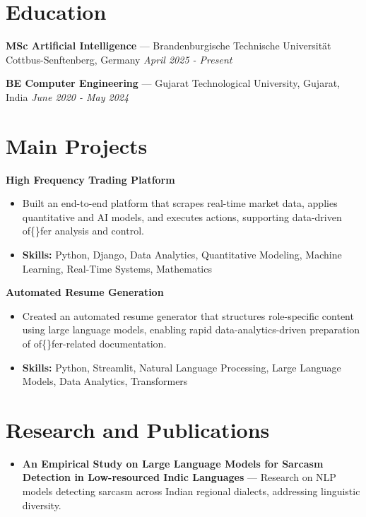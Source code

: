 \documentclass[a4paper,10pt]{article}
\begin{document}
\section*{Education}
\textbf{MSc Artificial Intelligence} — Brandenburgische Technische Universität Cottbus-Senftenberg, Germany \hfill \textit{April 2025 - Present}\par
\vspace{1.5pt}
\textbf{BE Computer Engineering} — Gujarat Technological University, Gujarat, India \hfill \textit{June 2020 - May 2024}\par

\section*{Main Projects}
\textbf{High Frequency Trading Platform}\par
\vspace{1pt}
\begin{itemize}
  \item Built an end-to-end platform that scrapes real-time market data, applies quantitative and AI models, and executes actions, supporting data-driven of\{\}fer analysis and control.
  \item \textbf{Skills:} Python, Django, Data Analytics, Quantitative Modeling, Machine Learning, Real-Time Systems, Mathematics
\end{itemize}
\vspace{3pt}
\textbf{Automated Resume Generation}\par
\vspace{1pt}
\begin{itemize}
  \item Created an automated resume generator that structures role-specific content using large language models, enabling rapid data-analytics-driven preparation of of\{\}fer-related documentation.
  \item \textbf{Skills:} Python, Streamlit, Natural Language Processing, Large Language Models, Data Analytics, Transformers
\end{itemize}

\section*{Research and Publications}
\begin{itemize}
\item \textbf{An Empirical Study on Large Language Models for Sarcasm Detection in Low-resourced Indic Languages} — Research on NLP models detecting sarcasm across Indian regional dialects, addressing linguistic diversity.
\end{itemize}
\end{document}
